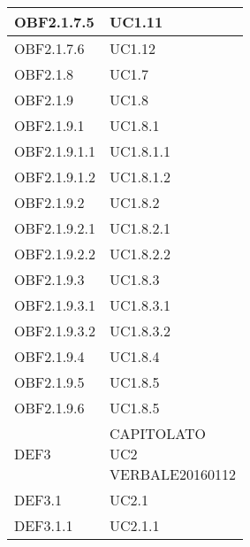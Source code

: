 \documentclass{scalatekids-article}
\begin{document}
\begin{longtable}[H]{|p{5.5cm}|p{5.5cm}|}
  \hline
  OBF2.1.7.5 & \multiLineCell[t]{UC1.11\\}\\
  \hline
  OBF2.1.7.6 & \multiLineCell[t]{UC1.12\\}\\
  \hline
  OBF2.1.8 & \multiLineCell[t]{UC1.7\\}\\
  \hline
  OBF2.1.9 & \multiLineCell[t]{UC1.8\\}\\
  \hline
  OBF2.1.9.1 & \multiLineCell[t]{UC1.8.1\\}\\
  \hline
  OBF2.1.9.1.1 & \multiLineCell[t]{UC1.8.1.1\\}\\
  \hline
  OBF2.1.9.1.2 & \multiLineCell[t]{UC1.8.1.2\\}\\
  \hline
  OBF2.1.9.2 & \multiLineCell[t]{UC1.8.2\\}\\
  \hline
  OBF2.1.9.2.1 & \multiLineCell[t]{UC1.8.2.1\\}\\
  \hline
  OBF2.1.9.2.2 & \multiLineCell[t]{UC1.8.2.2\\}\\
  \hline
  OBF2.1.9.3 & \multiLineCell[t]{UC1.8.3\\}\\
  \hline
  OBF2.1.9.3.1 & \multiLineCell[t]{UC1.8.3.1\\}\\
  \hline
  OBF2.1.9.3.2 & \multiLineCell[t]{UC1.8.3.2\\}\\
  \hline
  OBF2.1.9.4 & \multiLineCell[t]{UC1.8.4\\}\\
  \hline
  OBF2.1.9.5 & \multiLineCell[t]{UC1.8.5\\}\\
  \hline
  OBF2.1.9.6 & \multiLineCell[t]{UC1.8.5\\}\\
  \hline
  DEF3 & \multiLineCell[t]{CAPITOLATO\\UC2\\VERBALE20160112\\}\\
  \hline
  DEF3.1 & \multiLineCell[t]{UC2.1\\}\\
  \hline
  DEF3.1.1 & \multiLineCell[t]{UC2.1.1\\}\\

\end{longtable}
\end{document}
